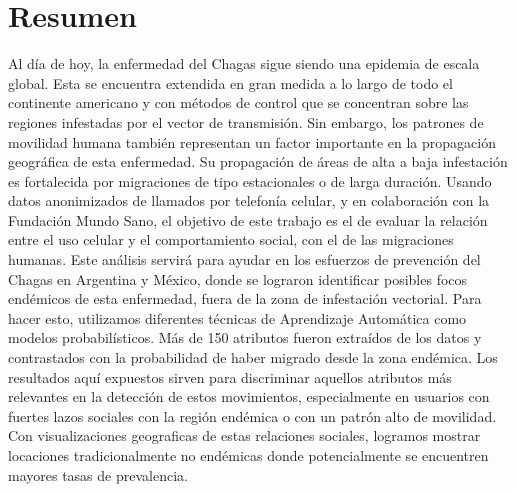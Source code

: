 \chapter{Resumen}
\label{cha:resumen}

Al día de hoy, la enfermedad del Chagas sigue siendo una epidemia de escala global. Esta se encuentra extendida en gran medida a lo largo de todo el continente americano y con métodos de control que se concentran sobre las regiones infestadas por el vector de transmisión. 
Sin embargo, los patrones de movilidad humana también representan un factor importante en la propagación geográfica de esta enfermedad. Su propagación de áreas de alta a baja infestación es fortalecida por migraciones de tipo estacionales o de larga duración. 
Usando datos anonimizados de llamados por telefonía celular, y en colaboración con la Fundación Mundo Sano, el objetivo de este trabajo es el de evaluar la relación entre el uso celular y el comportamiento social, con el de las migraciones humanas. Este análisis servirá para ayudar en los esfuerzos de prevención del Chagas en Argentina y México, donde se lograron identificar posibles focos endémicos de esta enfermedad, fuera de la zona de infestación vectorial. Para hacer esto, utilizamos diferentes técnicas de Aprendizaje Automática como modelos probabilísticos. Más de 150 atributos fueron extraídos de los datos y contrastados con la probabilidad de haber migrado desde la zona endémica. Los resultados aquí expuestos sirven para discriminar aquellos atributos más relevantes en la detección de estos movimientos, especialmente en usuarios con fuertes lazos sociales con la región endémica o con un patrón alto de movilidad. Con visualizaciones geograficas de estas relaciones sociales, logramos mostrar locaciones tradicionalmente no endémicas donde potencialmente se encuentren mayores tasas de prevalencia.
